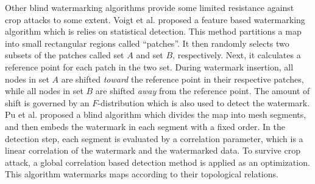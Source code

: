 Other blind watermarking algorithms
\cite{Voigt:2003,Schulz:2004,PuDJ06,Bird09:Shape,Kim11:copyright} 
provide some limited resistance against crop attacks to some extent. 
Voigt et al.\cite{Voigt:2003} 
proposed a feature based watermarking algorithm which is relies on statistical detection. 
This method partitions a map into small rectangular regions called ``patches''. 
It then randomly selects two subsets of the patches called set $A$ and set $B$,
respectively. Next, it calculates a reference point for each patch in the two set.
During watermark insertion, all nodes in set $A$ are shifted {\em toward} the reference point
in their respective patches, while all nodes in set $B$ are shifted {\em away} from
the reference point. The amount of shift is governed by an $F$-distribution 
\cite{abramowitz1965handbook}
which is also used to detect the watermark.
Pu et al. proposed a blind algorithm \cite{PuDJ06} which 
divides the map into mesh segments, and then
embeds the watermark in each segment with a fixed order. 
In the detection step, each segment is evaluated by a correlation parameter, which
is a linear correlation of the watermark and the watermarked data. 
To survive crop attack, a global correlation based detection method is 
applied as an optimization. This algorithm watermarks maps according to 
their topological relations. 

